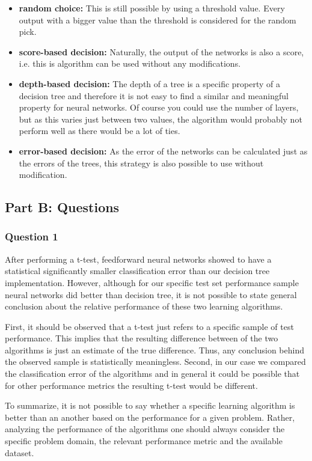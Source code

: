 \documentclass{article}
\begin{document}
\begin{itemize}
    \item \textbf{random choice:} This is still possible by using a threshold value. Every output with a bigger value than the threshold is considered for the random pick.
    \item \textbf{score-based decision:} Naturally, the output of the networks is also a score, i.e. this is algorithm can be used without any modifications.
    \item \textbf{depth-based decision:} The depth of a tree is a specific property of a decision tree and therefore it is not easy to find a similar and meaningful property for neural networks. Of course you could use the number of layers, but as this varies just between two values, the algorithm would probably not perform well as there would be a lot of ties.
    \item \textbf{error-based decision:} As the error of the networks can be calculated just as the errors of the trees, this strategy is also possible to use without modification.
\end{itemize}


\subsection{Part B: Questions}
\subsubsection*{Question 1}
After performing a t-test, feedforward neural networks showed to have a statistical significantly smaller classification error than our decision tree implementation. %
However, although for our specific test set performance sample neural networks did better than decision tree, it is not possible to state general conclusion about the relative performance of these two learning algorithms. 

First, it should be observed that a t-test just refers to a specific sample of test performance. This implies that the resulting difference between of the two algorithms is just an estimate of the true difference. Thus, any conclusion behind the observed sample is statistically meaningless. Second, in our case we compared the classification error of the algorithms and in general it could be possible that for other performance metrics the resulting t-test would be different. 

To summarize, it is not possible to say whether a specific learning algorithm is better than an another based on the performance for a given problem. Rather, analyzing the performance of the algorithms one should always consider the specific problem domain, the relevant performance metric and the available dataset.
\end{document}
